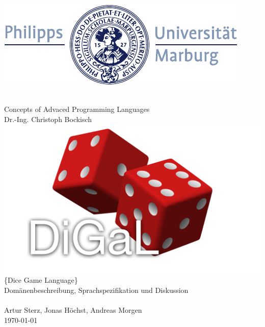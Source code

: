 \documentclass[a4paper, oneside]{book}
\begin{document}
	\begin{titlepage}
        \raggedright
        \includegraphics[width=.5\textwidth,right]{siegel.pdf}
        \begin{center}
            ~\\[2.5cm]
		    \Huge{Concepts of Advaced Programming Languages}
            ~\\[0.2cm]
            \large{Dr.-Ing. Christoph Bockisch}
            \large{}
            ~\\[3cm]
            \includegraphics[width=\textwidth]{Logo.pdf}
		    \Large{\{Dice Game Language\}}\\
		    \large{Domänenbeschreibung, Sprachspezifikation und Diskussion}\\
            ~\\[1cm]
		    \large{Artur Sterz, Jonas Höchst, Andreas Morgen}\\
		    \large{\today}
        \end{center}
	\end{titlepage}
	\tableofcontents
	\newpage

	
	
	
	
	
	
\end{document}
